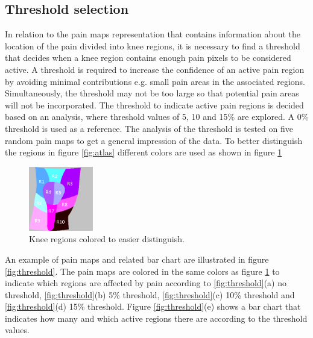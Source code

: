 \subsection{Threshold selection}\label{sec:Selectthreshold}
In relation to the pain maps representation that contains information about the location of the pain divided into knee regions, it is necessary to find a threshold that decides when a knee region contains enough pain pixels to be considered active. A threshold is required to increase the confidence of an active pain region by avoiding minimal contributions e.g. small pain areas in the associated regions. Simultaneously, the threshold may not be too large so that potential pain areas will not be incorporated. The threshold to indicate active pain regions is decided based on an analysis, where threshold values of 5, 10 and 15\% are explored. A 0\% threshold is used as a reference. 
The analysis of the threshold is tested on five random pain maps to get a general impression of the data. To better distinguish the regions in figure \ref{fig:atlas} different colors are used as shown in figure \ref{fig:colorregion}


\begin{figure} [H]
\centering
\includegraphics[width=0.25\textwidth]{figures/colorregion}
\caption{Knee regions colored to easier distinguish.}
\label{fig:colorregion}
\end{figure}

\noindent
An example of pain maps and related bar chart are illustrated in figure \ref{fig:threshold}. The pain maps are colored in the same colors as figure \ref{fig:colorregion} to indicate which regions are affected by pain according to \ref{fig:threshold}(a) no threshold, \ref{fig:threshold}(b) 5\% threshold, \ref{fig:threshold}(c) 10\% threshold and \ref{fig:threshold}(d) 15\% threshold. 
Figure \ref{fig:threshold}(e) shows a bar chart that indicates how many and which active regions there are according to the threshold values.

